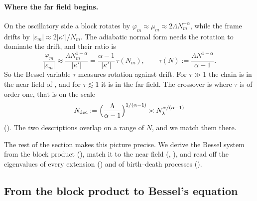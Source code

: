 \paragraph{Where the far field begins.} On the oscillatory side a block rotates by
$\varphi_m\approx\mu_m\approx2\Lambda N_m^{-\alpha}$, while the frame drifts by
$|\varepsilon_m|\approx2|\kappa'|/N_m$. The adiabatic normal form needs the rotation to dominate
the drift, and their ratio is
\[
  \frac{\varphi_m}{|\varepsilon_m|}\approx\frac{\Lambda N_m^{1-\alpha}}{|\kappa'|}=\frac{\alpha-1}{|\kappa'|}\,\tau(N_m),
  \qquad\tau(N):=\frac{\Lambda N^{1-\alpha}}{\alpha-1}.
\]
So the Bessel variable $\tau$ measures rotation against drift. For $\tau\gg1$ the chain is
in the near field of , and for $\tau\lesssim1$ it is in the far field.
The crossover is where $\tau$ is of order one, that is on the scale
\[
  N_{\rm dec}:=\Bigl(\frac{\Lambda}{\alpha-1}\Bigr)^{1/(\alpha-1)}\asymp N_\lambda^{\alpha/(\alpha-1)}
\]
(). The two descriptions overlap on a range of $N$, and we match them there.

The rest of the section makes this picture precise. We derive the Bessel system from the
block product (), match it to the near field
(, ), and read off the eigenvalues of every extension
() and of birth--death processes ().

\subsection{From the block product to Bessel's equation}\label{sec:bessel-derivation}

